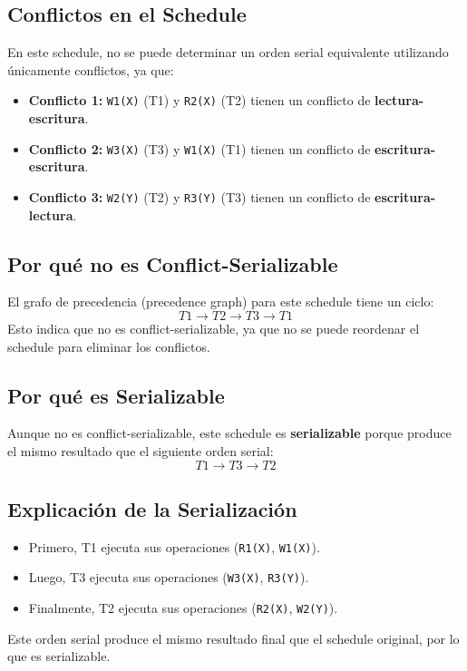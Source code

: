 \documentclass{article}
\begin{document}
\subsection{Conflictos en el Schedule}
En este schedule, no se puede determinar un orden serial equivalente utilizando únicamente conflictos, ya que:
\begin{itemize}
    \item \textbf{Conflicto 1:} \texttt{W1(X)} (T1) y \texttt{R2(X)} (T2) tienen un conflicto de \textbf{lectura-escritura}.
    \item \textbf{Conflicto 2:} \texttt{W3(X)} (T3) y \texttt{W1(X)} (T1) tienen un conflicto de \textbf{escritura-escritura}.
    \item \textbf{Conflicto 3:} \texttt{W2(Y)} (T2) y \texttt{R3(Y)} (T3) tienen un conflicto de \textbf{escritura-lectura}.
\end{itemize}

\subsection{Por qué no es Conflict-Serializable}
El grafo de precedencia (precedence graph) para este schedule tiene un ciclo:
\[
T1 \to T2 \to T3 \to T1
\]
Esto indica que no es conflict-serializable, ya que no se puede reordenar el schedule para eliminar los conflictos.

\subsection{Por qué es Serializable}
Aunque no es conflict-serializable, este schedule es \textbf{serializable} porque produce el mismo resultado que el siguiente orden serial:
\[
T1 \to T3 \to T2
\]

\subsection{Explicación de la Serialización}
\begin{itemize}
    \item Primero, T1 ejecuta sus operaciones (\texttt{R1(X)}, \texttt{W1(X)}).
    \item Luego, T3 ejecuta sus operaciones (\texttt{W3(X)}, \texttt{R3(Y)}).
    \item Finalmente, T2 ejecuta sus operaciones (\texttt{R2(X)}, \texttt{W2(Y)}).
\end{itemize}

Este orden serial produce el mismo resultado final que el schedule original, por lo que es serializable.
\end{document}

